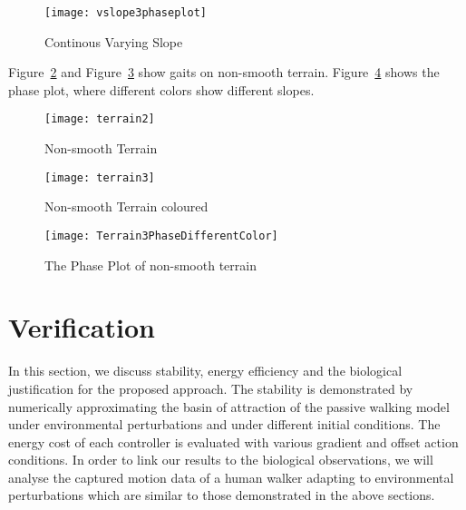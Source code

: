 \begin{figure}[!htbp]
  \begin{center}
      \texttt{[image: vslope3phaseplot]}
    \caption{Continous Varying Slope}
    \label{fig:vp2phas}
\end{center}
\end{figure}



Figure~\ref{fig:nonsmoothterrain1} and Figure~\ref{fig:nonsmootterrain2} show gaits on non-smooth terrain.
Figure~\ref{fig:diffterrain2} shows the phase plot, where different colors show different slopes.
\begin{figure}[!htbp]
  \begin{center}
      \texttt{[image: terrain2]}
    \caption{Non-smooth Terrain }
    \label{fig:nonsmoothterrain1}
\end{center}
\end{figure}

\begin{figure}[!htbp]
  \begin{center}
      \texttt{[image: terrain3]}
    \caption{Non-smooth Terrain coloured}
    \label{fig:nonsmootterrain2}
\end{center}
\end{figure}


\begin{figure}[!htbp]
  \begin{center}
    \texttt{[image: Terrain3PhaseDifferentColor]}
    \caption{The Phase Plot of non-smooth terrain}
    \label{fig:diffterrain2}
\end{center}
\end{figure}



\section{Verification}
In this section, we discuss stability, energy efficiency and the biological justification for the proposed approach. 
The stability is demonstrated by numerically approximating the basin of attraction of the passive walking model under environmental perturbations and under different initial conditions. 
The energy cost of each controller is evaluated with various gradient and offset action conditions. 
In order to link our results to the biological observations, we will analyse the captured motion data of a human walker adapting to environmental perturbations which are similar to those demonstrated in the above sections.
